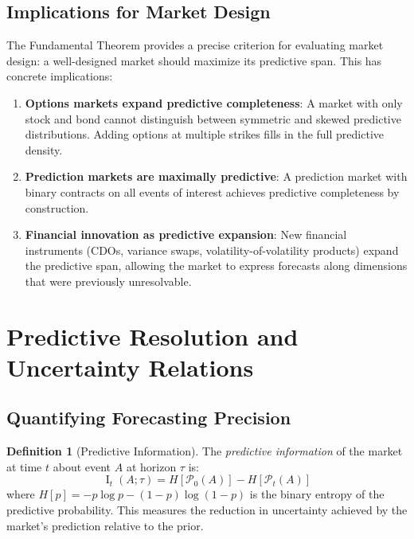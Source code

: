 \documentclass[12pt,a4paper]{article}
\theoremstyle{definition}
\newtheorem{definition}[theorem]{Definition}
\newcommand{\PP}{\mathcal{P}}
\DeclareMathOperator{\MI}{I}
\begin{document}
\subsection{Implications for Market Design}

The Fundamental Theorem provides a precise criterion for evaluating market design: a well-designed market should maximize its predictive span. This has concrete implications:

\begin{enumerate}[label=(\roman*)]
    \item \textbf{Options markets expand predictive completeness}: A market with only stock and bond cannot distinguish between symmetric and skewed predictive distributions. Adding options at multiple strikes fills in the full predictive density.
    
    \item \textbf{Prediction markets are maximally predictive}: A prediction market with binary contracts on all events of interest achieves predictive completeness by construction.
    
    \item \textbf{Financial innovation as predictive expansion}: New financial instruments (CDOs, variance swaps, volatility-of-volatility products) expand the predictive span, allowing the market to express forecasts along dimensions that were previously unresolvable.
\end{enumerate}



\section{Predictive Resolution and Uncertainty Relations}\label{sec:resolution}

\subsection{Quantifying Forecasting Precision}

\begin{definition}[Predictive Information]\label{def:pred_info}
The \emph{predictive information} of the market at time $t$ about event $A$ at horizon $\tau$ is:
\begin{equation}\label{eq:pred_info}
    \MI_t(A; \tau) = H[\PP_0(A)] - H[\PP_t(A)]
\end{equation}
where $H[p] = -p \log p - (1-p) \log(1-p)$ is the binary entropy of the predictive probability. This measures the reduction in uncertainty achieved by the market's prediction relative to the prior.
\end{definition}
\end{document}

